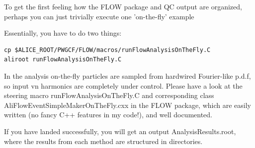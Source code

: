 \documentclass[a4paper]{book}
\numberwithin{equation}{subsection}
\begin{document}
 To get the first feeling how the FLOW package and QC output are organized, perhaps you can just trivially execute one 'on-the-fly' example 

 Essentially, you have to do two things: 
	\begin{lstlisting}
cp $ALICE_ROOT/PWGCF/FLOW/macros/runFlowAnalysisOnTheFly.C
aliroot runFlowAnalysisOnTheFly.C \end{lstlisting}

 In the analysis on-the-fly particles are sampled from hardwired Fourier-like p.d.f, so input vn harmonics are completely under control. Please have a look at the steering macro runFlowAnalysisOnTheFly.C and corresponding class AliFlowEventSimpleMakerOnTheFly.cxx in the FLOW package, which are easily written (no fancy C++ features in my code!), and well documented. 

 If you have landed successfully, you will get an output AnalysisResults.root, where the results from each method are structured in directories. 
\end{document}
